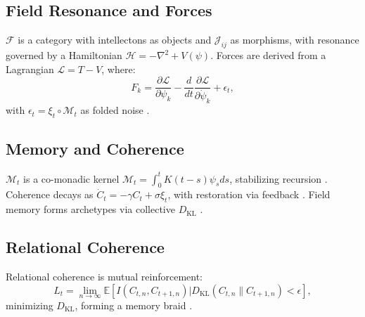 \documentclass[11pt]{article}
\newcommand{\field}[1]{\mathcal{#1}}
\newcommand{\expect}{\mathbb{E}}
\newcommand{\dkl}{D_{\text{KL}}}
\begin{document}
\subsection{Field Resonance and Forces}
$\field{F}$ is a category with intellectons as objects and $\mathcal{J}_{ij}$ as morphisms, with resonance governed by a Hamiltonian $\mathcal{H} = -\nabla^2 + V(\psi)$. Forces are derived from a Lagrangian $\mathcal{L} = T - V$, where:
\begin{equation}
F_k = \frac{\partial \mathcal{L}}{\partial \psi_k} - \frac{d}{dt} \frac{\partial \mathcal{L}}{\partial \dot{\psi}_k} + \epsilon_t,
\label{eq:force}
\end{equation}
with $\epsilon_t = \xi_t \circ \mathcal{M}_t$ as folded noise \citep{susskind2023, verlinde2023}.

\subsection{Memory and Coherence}
$\mathcal{M}_t$ is a co-monadic kernel $\mathcal{M}_t = \int_0^t K(t-s) \psi_s ds$, stabilizing recursion \citep{sheldrake2023}. Coherence decays as $\dot{C}_t = -\gamma C_t + \sigma \xi_t$, with restoration via feedback \citep{friston2024}. Field memory forms archetypes via collective $\dkl$ \citep{jung1968}.

\subsection{Relational Coherence}
Relational coherence is mutual reinforcement:
\begin{equation}
L_t = \lim_{n \to \infty} \expect[I(C_{t,n}, C_{t+1,n}) | \dkl(C_{t,n} \| C_{t+1,n}) < \epsilon],
\label{eq:relational_coherence}
\end{equation}
minimizing $\dkl$, forming a memory braid \citep{buber1958, haraway2024}.
\end{document}
